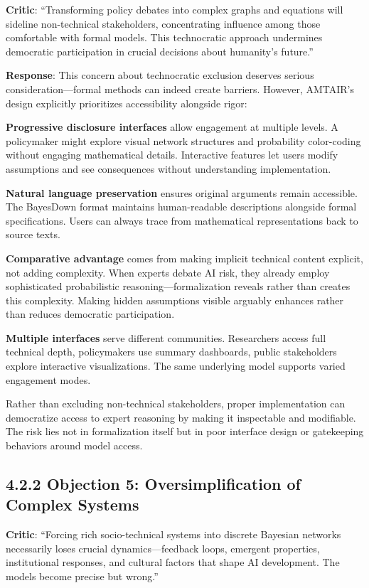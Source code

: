 \documentclass[
  11pt,
  letterpaper,
  openany]{book}
\begin{document}
\textbf{Critic}: ``Transforming policy debates into complex graphs and
equations will sideline non-technical stakeholders, concentrating
influence among those comfortable with formal models. This technocratic
approach undermines democratic participation in crucial decisions about
humanity's future.''

\textbf{Response}: This concern about technocratic exclusion deserves
serious consideration---formal methods can indeed create barriers.
However, AMTAIR's design explicitly prioritizes accessibility alongside
rigor:

\textbf{Progressive disclosure interfaces} allow engagement at multiple
levels. A policymaker might explore visual network structures and
probability color-coding without engaging mathematical details.
Interactive features let users modify assumptions and see consequences
without understanding implementation.

\textbf{Natural language preservation} ensures original arguments remain
accessible. The BayesDown format maintains human-readable descriptions
alongside formal specifications. Users can always trace from
mathematical representations back to source texts.

\textbf{Comparative advantage} comes from making implicit technical
content explicit, not adding complexity. When experts debate AI risk,
they already employ sophisticated probabilistic
reasoning---formalization reveals rather than creates this complexity.
Making hidden assumptions visible arguably enhances rather than reduces
democratic participation.

\textbf{Multiple interfaces} serve different communities. Researchers
access full technical depth, policymakers use summary dashboards, public
stakeholders explore interactive visualizations. The same underlying
model supports varied engagement modes.

Rather than excluding non-technical stakeholders, proper implementation
can democratize access to expert reasoning by making it inspectable and
modifiable. The risk lies not in formalization itself but in poor
interface design or gatekeeping behaviors around model access.

\subsection{4.2.2 Objection 5: Oversimplification of Complex
Systems}\label{sec-oversimplification}

\textbf{Critic}: ``Forcing rich socio-technical systems into discrete
Bayesian networks necessarily loses crucial dynamics---feedback loops,
emergent properties, institutional responses, and cultural factors that
shape AI development. The models become precise but wrong.''
\end{document}
